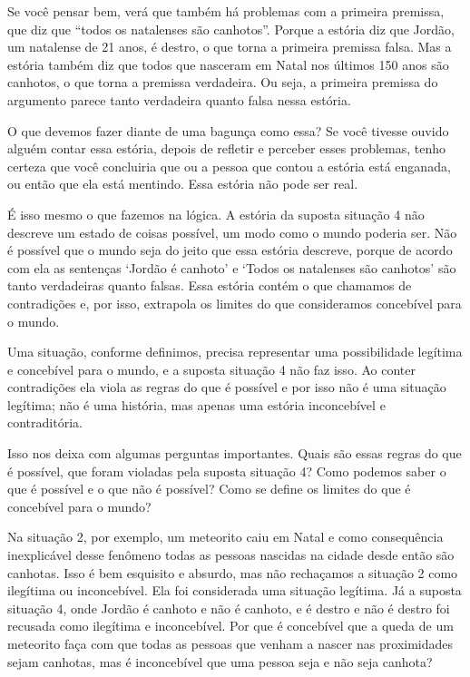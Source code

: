 Se você pensar bem, verá que também há problemas com a primeira premissa, que diz que ``todos os natalenses são canhotos''.
Porque a estória diz que Jordão, um natalense de 21 anos,  é destro, o que torna a primeira premissa falsa.
Mas a estória também diz que todos que nasceram em Natal nos últimos 150 anos são canhotos, o que torna a premissa verdadeira.
Ou seja, a primeira premissa do argumento parece tanto verdadeira quanto falsa nessa estória.

O que devemos fazer diante de uma bagunça como essa?
Se  você tivesse ouvido alguém contar essa estória, depois de refletir e perceber esses problemas, tenho certeza que você concluiria que ou a pessoa que contou a estória está enganada, ou então que ela está mentindo.
Essa estória não pode ser real.

É isso mesmo o que fazemos na lógica.
A estória da suposta situação 4 não descreve um estado de coisas possível, um modo como o mundo poderia ser.
Não é possível que o mundo seja do jeito que essa estória descreve, porque de acordo com ela as sentenças `Jordão é canhoto' e `Todos os natalenses são canhotos' são tanto verdadeiras quanto falsas.
Essa estória contém o que chamamos de contradições e, por isso, extrapola os limites do que consideramos concebível para o mundo.

Uma situação, conforme definimos, precisa representar uma possibilidade legítima e concebível para o mundo, e a suposta situação 4 não faz isso.
Ao conter contradições ela viola as regras do que é possível e por isso não é uma situação legítima; não é uma história, mas apenas uma estória inconcebível e contraditória.

Isso nos deixa com algumas perguntas importantes.
Quais são essas regras do que é possível, que foram violadas pela suposta situação 4?
Como podemos saber o que é possível e o que não é possível?
Como se define os limites do que é concebível para o mundo?

Na situação 2, por exemplo, um meteorito caiu em Natal e como consequência inexplicável desse fenômeno todas as pessoas nascidas na cidade desde então são canhotas.
Isso é bem esquisito e absurdo, mas não rechaçamos a situação 2 como ilegítima ou inconcebível.
Ela foi considerada uma situação legítima.
Já a suposta situação 4, onde Jordão é canhoto e não é canhoto, e é destro e não é destro foi recusada como ilegítima e inconcebível.
Por que é concebível que a queda de um meteorito faça com que todas as pessoas que venham a nascer nas proximidades sejam canhotas, mas é inconcebível que uma pessoa seja e não seja canhota?

